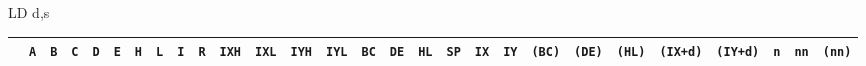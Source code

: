 \begin{basedescript}{
    \desclabelstyle{\multilinelabel}
    \desclabelwidth{3cm}}
\begin{DetailItem}{LD d,s}
        {
            \fontsize{9pt}{9pt}	%
            \setlength{\tabcolsep}{1pt}
            \newcommand{\OO}{$\bullet$}
            \newcommand{\ii}{\cellcolor{llgray}}

            \begin{tabular}{@{}|c|c|c|c|c|c|c|c|c|c|c|c|c|c|c|c|c|c|c|c|c|c|c|c|c|c|c|c|}
                \arrayrulecolor{gray}
                \hline
                & {\tt A} & {\tt B} & {\tt C} & {\tt D} & {\tt E} & {\tt H} & {\tt L} & {\tt I} & {\tt R} & {\tt IXH} & {\tt IXL} & {\tt IYH} & {\tt IYL} & {\tt BC} & {\tt DE} & {\tt HL} & {\tt SP} & {\tt IX} & {\tt IY} & {\tt (BC)} & {\tt (DE)} & {\tt (HL)} & {\tt (IX+d)} & {\tt (IY+d)} & {\tt n} & {\tt nn} & {\tt (nn)} \\
                \hline


\end{tabular}}
\end{DetailItem}
\end{basedescript}

